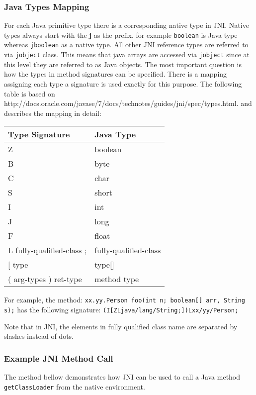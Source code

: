 \subsubsection{Java Types Mapping}
For each Java primitive type there is a corresponding native type in JNI. Native types always start with the \textbf{j} as the prefix, for example \texttt{boolean} is Java type whereas \texttt{jboolean} as a native type.
All other JNI reference types are referred to via \texttt{jobject} class. This means that java arrays are accessed via \texttt{jobject} since at this level they are referred to as Java objects. The most important question is how the types in method signatures can be specified. There is a mapping assigning each type a signature is used exactly for this purpose. The following table is based on http://docs.oracle.com/javase/7/docs/technotes/guides/jni/spec/types.html. and describes the mapping in detail:
\begin{center}
\begin{tabular}{ l l }
	  \hline
	  Type Signature & Java Type \\ \hline
	Z & boolean \\
	B & byte \\
	C & char \\
	S & short \\
	I & int \\
	J & long \\
	F & float \\
	L fully-qualified-class ; & fully-qualified-class \\
	{[} type & type{[]}\ \\
	( arg-types ) ret-type & method type \\
\end{tabular}
\end{center}

For example, the method: \newline \texttt{xx.yy.Person foo(int n; boolean[] arr, String s);} has the following signature:
\texttt{(I[ZLjava/lang/String;])Lxx/yy/Person;}

Note that in JNI, the elements in fully qualified class name are separated by slashes instead of dots.
\subsubsection{Example JNI Method Call}
The method bellow demonstrates how JNI can be used to call a Java method \texttt{getClassLoader} from the native environment.

